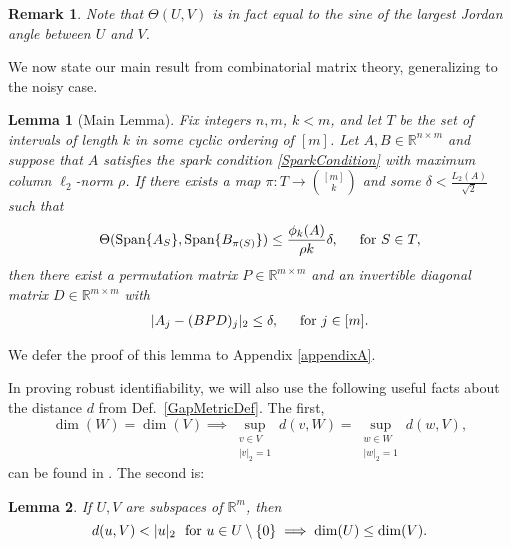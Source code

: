 \documentclass[journal, twocolumn]{IEEEtran}
\newtheorem{lemma}{Lemma}
\newtheorem{remark}{Remark}
\begin{document}
\begin{remark}
Note that $\Theta(U,V)$ is in fact equal to the sine of the largest Jordan angle between $U$ and $V$.
\end{remark}

We now state our main result from combinatorial matrix theory, generalizing \cite[Lem.~1]{Hillar15} to the noisy case.

\begin{lemma}[Main Lemma]\label{MainLemma}
Fix integers $n, m$, $k < m$, and let $T$ be the set of intervals of length $k$ in some cyclic ordering of $[m]$. Let $A, B \in \mathbb{R}^{n \times m}$ and suppose that $A$ satisfies the spark condition \eqref{SparkCondition} with maximum column $\ell_2$-norm $\rho$.  If there exists a map $\pi: T \to {[m] \choose k}$ and some $\delta < \frac{L_{2}(A)}{\sqrt{2}}$ such that 
\begin{equation}\label{GapUpperBound}
\Theta(\text{\rm Span}\{A_{S}\}, \text{\rm Span}\{B_{\pi(S)}\}) \leq \frac{ \phi_k(A) }{\rho k} \delta, \indent \text{for } S \in T,
\end{equation}
%
then there exist a permutation matrix $P \in \mathbb{R}^{m \times m}$ and an invertible diagonal matrix $D \in \mathbb{R}^{m \times m}$ with
\begin{align}
|A_j - (BPD)_j|_2 \leq \delta, \indent \text{for } j \in [m].
\end{align}
\end{lemma}
We defer the proof of this lemma to Appendix \ref{appendixA}. 

In proving robust identifiability, we will also use the following useful facts about the distance $d$ from Def.~\ref{GapMetricDef}. The first, 
\begin{equation}\label{SubspaceMetricSameDim}
\dim(W) = \dim(V) \implies \sup_{\substack{v \in V \\ |v|_2 = 1}}  d(v,W)  = \sup_{\substack{w \in W \\ |w|_2 = 1}} d(w,V),
\end{equation}
can be found in \cite[Lem.~3.3]{Morris10}. The second is:
\begin{lemma}\label{MinDimLemma}
If $U, V$ are subspaces of $\mathbb{R}^{m}$, then
\begin{equation}\label{MinDim}
d(u,V) < |u|_2 \ \ \text{\rm for } u \in U \setminus{\{0\}} \implies \dim(U) \leq \dim(V).
\end{equation}
\end{lemma}
\end{document}
